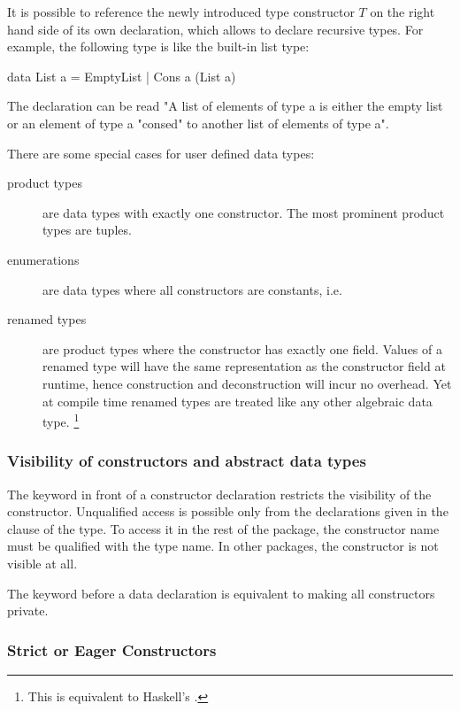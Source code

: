 It is possible to reference the newly introduced type constructor $T$ on the right hand side of its own declaration, which allows to declare recursive types. For example, the following type is like the built-in list type:

\begin{code}
data List a = EmptyList | Cons a (List a)
\end{code}

The declaration can be read "A list of elements of type a is either the empty list or an element of type a "consed" to another list of elements of type a".

There are some special cases for user defined data types:
\begin{description}
\item [product types] are data types with exactly one constructor. The most prominent product types are tuples.
\item [enumerations] are data types where all constructors are constants, i.e. 
\item [renamed types] \label{renamed-types} are product types where the constructor has exactly one field. Values of a renamed type will have the same representation as the constructor field at runtime, hence construction and deconstruction will incur no overhead. Yet at compile time renamed types are treated like any other algebraic data type.
\footnote{This is equivalent to Haskell's .}
\end{description}

\subsubsection{Visibility of constructors and abstract data types}

The keyword  in front of a constructor declaration restricts the visibility of the constructor. Unqualified access is possible only from the declarations given in the  clause of the type. To access it in the rest of the package, the constructor name must be qualified with the type name. In other packages, the constructor is not visible at all.

The keyword  before a data declaration is equivalent to making all constructors private.

\subsubsection{Strict or Eager Constructors}

